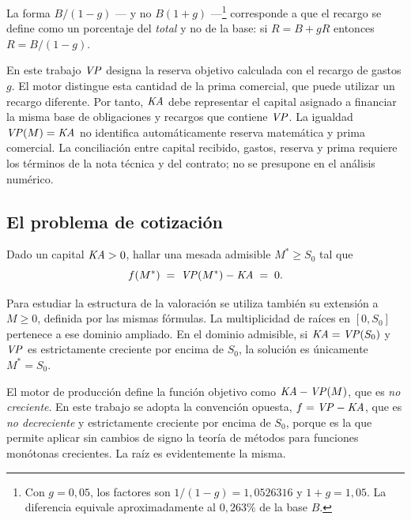 La forma $B/(1-g)$ --- y no $B(1+g)$ ---\footnote{Con $g=0{,}05$, los factores son $1/(1-g)=1{,}0526316$ y $1+g=1{,}05$. La diferencia equivale aproximadamente al $0{,}263\%$ de la base $B$.} corresponde a que el recargo se define
como un porcentaje del \emph{total} y no de la base: si $R=B+gR$ entonces
$R=B/(1-g)$.

\begin{remark}
En este trabajo $\mathit{VP}$ designa la reserva objetivo calculada con el recargo
de gastos $g$. El motor distingue esta cantidad de la prima comercial,
que puede utilizar un recargo diferente. Por tanto, $\mathit{KA}$ debe representar
el capital asignado a financiar la misma base de obligaciones y recargos
que contiene $\mathit{VP}$. La igualdad $\mathit{VP}(M)=\mathit{KA}$ no identifica automáticamente
reserva matemática y prima comercial. La conciliación entre capital recibido,
gastos, reserva y prima requiere los términos de la nota técnica y del
contrato; no se presupone en el análisis numérico.
\end{remark}

\subsection{El problema de cotización}

\begin{definition}
\label{def:problema}
Dado un capital $\mathit{KA}>0$, hallar una mesada admisible $M^*\ge S_0$ tal que
\begin{equation}
\label{eq:problema}
  f(M^*)\;=\;\mathit{VP}(M^*)-\mathit{KA}\;=\;0.
\end{equation}
\end{definition}

Para estudiar la estructura de la valoración se utiliza también su extensión
a $M\ge0$, definida por las mismas fórmulas. La multiplicidad de raíces en
$[0,S_0]$ pertenece a ese dominio ampliado. En el dominio admisible, si
$\mathit{KA}=\mathit{VP}(S_0)$ y $\mathit{VP}$ es estrictamente creciente por encima de $S_0$,
la solución es únicamente $M^*=S_0$.

\begin{remark}
El motor de producción define la función objetivo como $\mathit{KA}-\mathit{VP}(M)$, que es
\emph{no creciente}. En este trabajo se adopta la convención opuesta,
$f=\mathit{VP}-\mathit{KA}$, que es \emph{no decreciente} y estrictamente creciente por encima
de $S_0$, porque es la que permite aplicar sin cambios
de signo la teoría de métodos para funciones monótonas crecientes. La raíz es
evidentemente la misma.
\end{remark}

